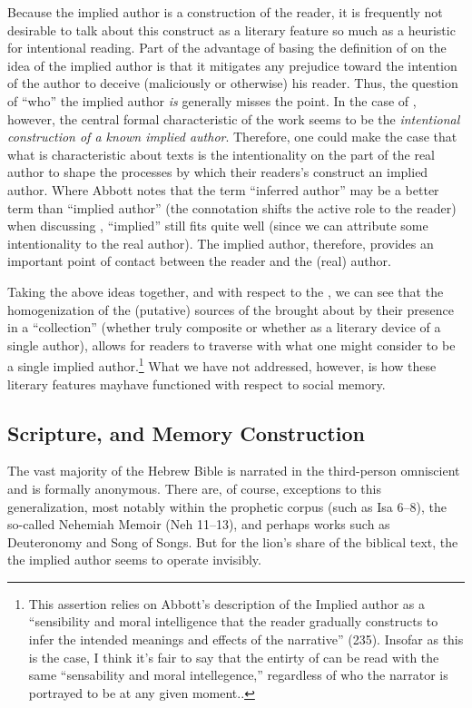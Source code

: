  Because the implied author is a construction of the reader, it is frequently not desirable to talk about this construct as a literary feature so much as a heuristic for intentional reading. Part of the advantage of basing the definition of \psy on the idea of the implied author is that it mitigates any prejudice toward the intention of the author to deceive (maliciously or otherwise) his reader. Thus, the question of ``who'' the implied author \emph{is} generally misses the point. In the case of \psy, however, the central formal characteristic of the work seems to be the \emph{intentional construction of a known implied author}. Therefore, one could make the case that what is characteristic about \psgraphic texts is the intentionality on the part of the real author to shape the processes by which their readers's construct an implied author. Where Abbott notes that the term ``inferred author'' may be a better term than ``implied author'' (the connotation shifts the active role to the reader) when discussing \psy, ``implied'' still fits quite well (since we can attribute some intentionality to the real author). The implied author, therefore, provides an important point of contact between the reader and the (real) author.

Taking the above ideas together, and with respect to the \ga, we can see that the homogenization of the (putative) sources of the \ga brought about by their presence in a ``collection'' (whether truly composite or whether as a literary device of a single author), allows for readers to traverse \ga with what one might consider to be a single implied author.\footnote{This assertion relies on Abbott's description of the Implied author as a ``sensibility and moral intelligence that the reader gradually constructs to infer the intended meanings and effects of the narrative'' (235). Insofar as this is the case, I think it's fair to say that the entirty of \ga can be read with the same ``sensability and moral intellegence,'' regardless of who the narrator is portrayed to be at any given moment.\autocite[235]{abbott2008}.} What we have not addressed, however, is how these literary features mayhave functioned with respect to social memory.

 \subsection{Scripture, \Psy and Memory Construction}

 The vast majority of the Hebrew Bible is narrated in the third-person omniscient and is formally anonymous. There are, of course, exceptions to this generalization, most notably within the prophetic corpus (such as Isa 6--8), the so-called Nehemiah Memoir (Neh 11--13), and perhaps works such as Deuteronomy and Song of Songs. But for the lion's share of the biblical text, the the implied author seems to operate invisibly.

